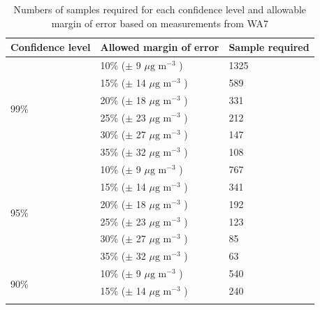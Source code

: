 \begin{table}[H]
\caption{Numbers of samples required for each confidence level and allowable margin of error based on measurements from WA7}
\centering
\begin{tabular}{|l|l|l|}
\hline
Confidence level     &            Allowed margin of error                            &        Sample required       \\
\hline
\multirow{6}{*}{99\%}   &            10\% ($\pm$ 9   $\mu \text{g m}^{-3}$ )    &        1325                  \\ \cline{2-3} 
                        &            15\% ($\pm$ 14  $\mu \text{g m}^{-3}$ )    &        589                   \\ \cline{2-3} 
                        &            20\% ($\pm$ 18  $\mu \text{g m}^{-3}$ )    &        331                   \\ \cline{2-3}
                        &            25\% ($\pm$ 23  $\mu \text{g m}^{-3}$ )    &        212                   \\ \cline{2-3}
                        &            30\% ($\pm$ 27  $\mu \text{g m}^{-3}$ )    &        147                   \\ \cline{2-3}
                        &            35\% ($\pm$ 32  $\mu \text{g m}^{-3}$ )    &        108                   \\ \hline
\multirow{6}{*}{95\%}   &            10\% ($\pm$ 9   $\mu \text{g m}^{-3}$ )    &        767                   \\ \cline{2-3} 
                        &            15\% ($\pm$ 14  $\mu \text{g m}^{-3}$ )    &        341                   \\ \cline{2-3} 
                        &            20\% ($\pm$ 18  $\mu \text{g m}^{-3}$ )    &        192                   \\ \cline{2-3} 
                        &            25\% ($\pm$ 23  $\mu \text{g m}^{-3}$ )    &        123                   \\ \cline{2-3} 
                        &            30\% ($\pm$ 27  $\mu \text{g m}^{-3}$ )    &        85                    \\ \cline{2-3} 
                        &            35\% ($\pm$ 32  $\mu \text{g m}^{-3}$ )    &        63                    \\ \hline
\multirow{6}{*}{90\%}   &            10\% ($\pm$ 9   $\mu \text{g m}^{-3}$ )    &        540                   \\ \cline{2-3} 
                        &            15\% ($\pm$ 14  $\mu \text{g m}^{-3}$ )    &        240                   \\ \cline{2-3} 

\end{tabular}
\end{table}
